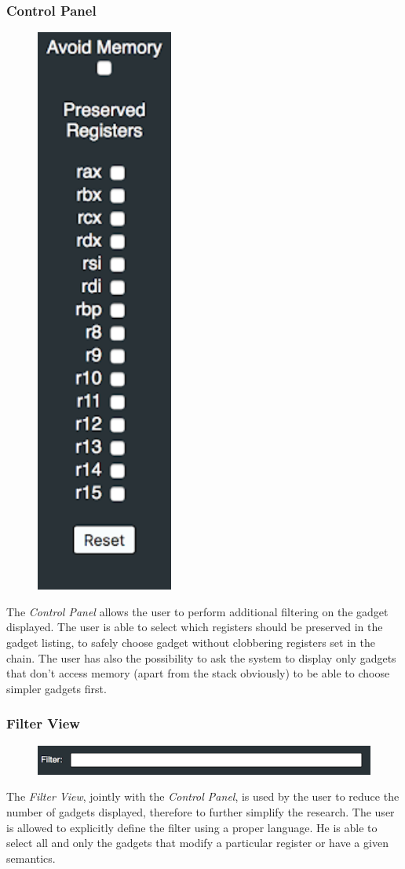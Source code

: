 \documentclass[twocolumn, 11pt]{article}
\begin{document}
\subsubsection{Control Panel}
\begin{figure}[htb]
  \centering
  \includegraphics[width=0.15\linewidth]{control-panel}
\end{figure}

The \textit{Control Panel} allows the user to perform additional filtering on the gadget displayed. The user is able to select which registers should be preserved in the gadget listing, to safely choose gadget without clobbering registers set in the chain. The user has also the possibility to ask the system to display only gadgets that don't access memory (apart from the stack obviously) to be able to choose simpler gadgets first.

\subsubsection{Filter View}
\begin{figure}[htb]
  \centering
  \includegraphics[width=0.9\linewidth]{filter-view}
\end{figure}

The \textit{Filter View}, jointly with the \textit{Control Panel}, is used by the user to reduce the number of gadgets displayed, therefore to further simplify the research. The user is allowed to explicitly define the filter using a proper language. He is able to select all and only the gadgets that modify a particular register or have a given semantics.
\end{document}
